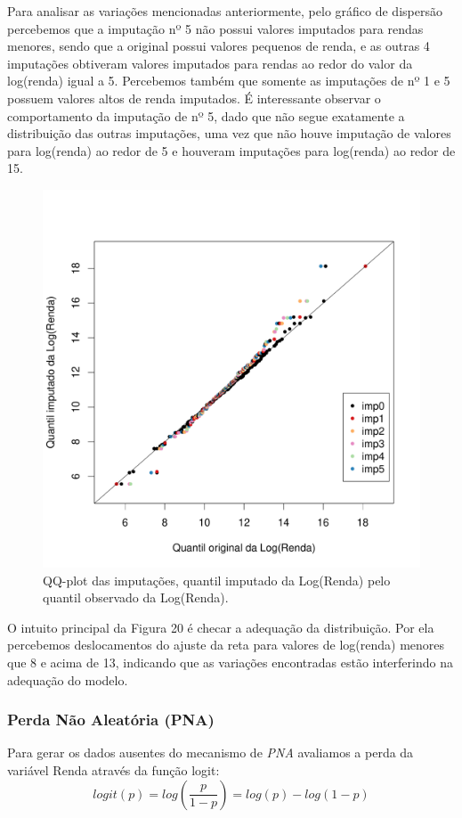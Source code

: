\documentclass[]{article}
\begin{document}
Para analisar as variações mencionadas anteriormente, pelo gráfico de
dispersão percebemos que a imputação nº 5 não possui valores imputados
para rendas menores, sendo que a original possui valores pequenos de
renda, e as outras 4 imputações obtiveram valores imputados para rendas
ao redor do valor da log(renda) igual a 5. Percebemos também que somente
as imputações de nº 1 e 5 possuem valores altos de renda imputados. É
interessante observar o comportamento da imputação de nº 5, dado que não
segue exatamente a distribuição das outras imputações, uma vez que não
houve imputação de valores para log(renda) ao redor de 5 e houveram
imputações para log(renda) ao redor de 15.

\begin{figure}[H]

{\centering \includegraphics[width=0.6\linewidth]{p53-graf} 

}

\caption{QQ-plot das imputações, quantil imputado da Log(Renda) pelo quantil observado da Log(Renda).}\label{fig:unnamed-chunk-28}
\end{figure}

O intuito principal da Figura 20 é checar a adequação da distribuição.
Por ela percebemos deslocamentos do ajuste da reta para valores de
log(renda) menores que 8 e acima de 13, indicando que as variações
encontradas estão interferindo na adequação do modelo.

\subsubsection{Perda Não Aleatória (PNA)}\label{perda-nao-aleatoria-pna}

Para gerar os dados ausentes do mecanismo de \emph{PNA} avaliamos a
perda da variável Renda através da função logit:
\[logit(p) = log( \frac{p}{1-p} ) = log(p) - log(1-p)\]
\end{document}
